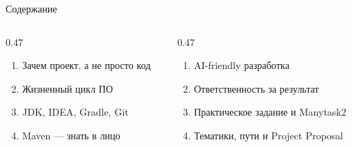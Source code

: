 \begin{frame}{Содержание}
  \vspace{0.4em}
  \begin{columns}[T]
    \begin{column}{0.47\textwidth}
      \begin{enumerate}\setlength\itemsep{0.55em}
        \item Зачем проект, а не \flqq просто код\frqq
        \item Жизненный цикл ПО
        \item JDK, IDEA, Gradle, Git
        \item Maven --- знать в лицо
      \end{enumerate}
    \end{column}
    \begin{column}{0.47\textwidth}
      \begin{enumerate}\setlength\itemsep{0.55em}\setcounter{enumi}{4}
        \item AI-friendly разработка
        \item Ответственность за результат
        \item Практическое задание и Manytask2
        \item Тематики, пути и Project Proposal
      \end{enumerate}
    \end{column}
  \end{columns}
\end{frame}
